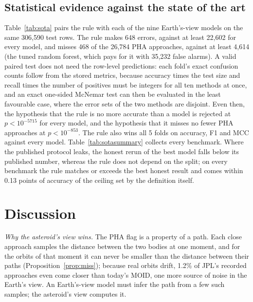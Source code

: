 \documentclass[conference]{IEEEtran}
\begin{document}
\subsection{Statistical evidence against the state of the art}
Table~\ref{tab:sota} pairs the rule with each of the nine Earth's-view models on the same 306,590 test rows. The rule makes 648 errors, against at least 22,602 for every model, and misses 468 of the 26,784 PHA approaches, against at least 4,614 (the tuned random forest, which pays for it with 35,232 false alarms). A valid paired test does not need the row-level predictions: each fold's exact confusion counts follow from the stored metrics, because accuracy times the test size and recall times the number of positives must be integers for all ten methods at once, and an exact one-sided McNemar test can then be evaluated in the least favourable case, where the error sets of the two methods are disjoint. Even then, the hypothesis that the rule is no more accurate than a model is rejected at $p<10^{-5715}$ for every model, and the hypothesis that it misses no fewer PHA approaches at $p<10^{-853}$. The rule also wins all 5 folds on accuracy, F1 and MCC against every model. Table~\ref{tab:sotasummary} collects every benchmark. Where the published protocol leaks, the honest rerun of the best model falls below its published number, whereas the rule does not depend on the split; on every benchmark the rule matches or exceeds the best honest result and comes within 0.13 points of accuracy of the ceiling set by the definition itself.




\section{Discussion}

\emph{Why the asteroid's view wins.} The PHA flag is a property of a path. Each close approach samples the distance between the two bodies at one moment, and for the orbits of that moment it can never be smaller than the distance between their paths (Proposition~\ref{prop:miss}); because real orbits drift, 1.2\% of JPL's recorded approaches even come closer than today's MOID, one more source of noise in the Earth's view. An Earth's-view model must infer the path from a few such samples; the asteroid's view computes it.
\end{document}
